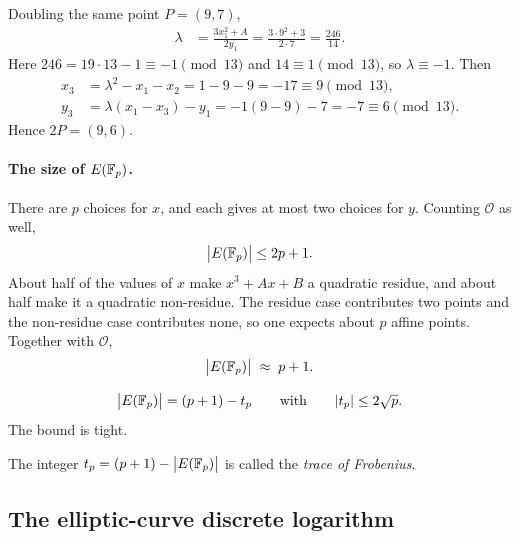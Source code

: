 
Doubling the same point $P=(9,7)$,
\begin{align*}
    \lambda
    &=\frac{3x_1^2+A}{2y_1}
     =\frac{3\cdot 9^2+3}{2\cdot 7}
     =\frac{246}{14}.
\end{align*}
Here $246=19\cdot 13-1\equiv -1\pmod{13}$ and $14\equiv 1\pmod{13}$, so $\lambda\equiv -1$. Then
\begin{align*}
    x_3
    &=\lambda^2-x_1-x_2
     =1-9-9
     =-17
     \equiv 9\pmod{13},\\
    y_3
    &=\lambda(x_1-x_3)-y_1
     =-1(9-9)-7
     =-7
     \equiv 6\pmod{13}.
\end{align*}
Hence $2P=(9,6)$.

\paragraph{The size of $E(\mathbb F_p)$.}
There are $p$ choices for $x$, and each gives at most two choices for $y$. Counting $\mathcal{O}$ as well,
\[
    \bigl|E(\mathbb F_p)\bigr|\leq 2p+1.
\]
About half of the values of $x$ make $x^3+Ax+B$ a quadratic residue, and about half make it a quadratic non-residue. The residue case contributes two points and the non-residue case contributes none, so one expects about $p$ affine points. Together with $\mathcal{O}$,
\[
    \bigl|E(\mathbb F_p)\bigr|\;\approx\; p+1.
\]

\begin{keybox}
\begin{theorem}
\[
    \bigl|E(\mathbb F_p)\bigr|=(p+1)-t_p
    \qquad\text{with}\qquad
    |t_p|\leq 2\sqrt{p}.
\]
The bound is tight.
\end{theorem}
\end{keybox}


The integer $t_p=(p+1)-\bigl|E(\mathbb F_p)\bigr|$ is called the \emph{trace of Frobenius}.

\subsection{The elliptic-curve discrete logarithm}

